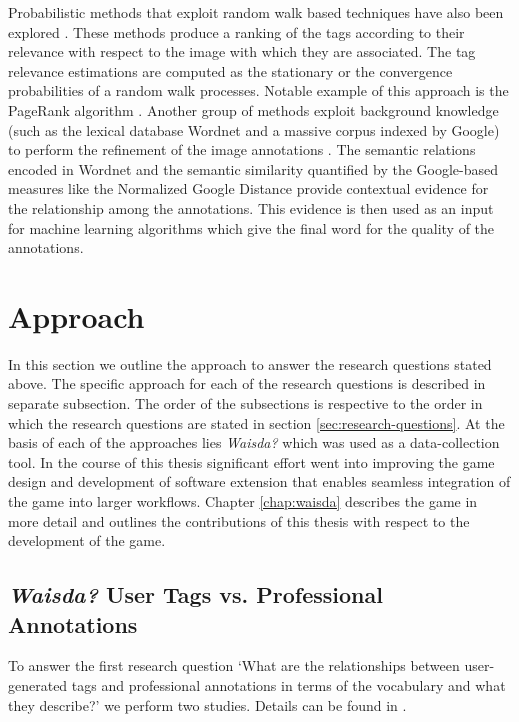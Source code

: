 Probabilistic methods that exploit random walk based techniques have also been explored \cite{Wang:2006:IAR:1180639.1180774,Liu:2009:TR:1526709.1526757,Li:2012:TRP:2382336.2382380}. These methods produce a ranking of the tags according to their relevance with respect to the image with which they are associated. The tag relevance estimations are computed as the stationary or the convergence probabilities of  a random walk processes. Notable example of this approach is the PageRank algorithm \cite{journals/corr/abs-1012-4872,10.4137/GRSB.S702,junker2008analysis}. Another group of methods exploit background knowledge (such as the lexical database Wordnet and a massive corpus indexed by Google) to perform the refinement of the image annotations \cite{Jin:2010:KBI:1731523.1731529,Wang:2007:RIA:1282280.1282343}. The semantic relations encoded in Wordnet and the semantic similarity quantified by the Google-based measures like the Normalized Google Distance \cite{DBLP:journals/corr/abs-cs-0412098} provide contextual evidence for the relationship among the annotations. This evidence is then used as an input for machine learning algorithms which give the final word for the quality of the annotations.

\section{Approach}
In this section we outline the approach to answer the research questions stated above. The specific approach for each of the research questions is described in separate subsection. The order of the subsections is respective to the order in which the research questions are stated in section \ref{sec:research-questions}. At the basis of each of the approaches lies \textit{Waisda?} which was used as a data-collection tool. In the course of this thesis significant effort went into improving the game design and development of software extension that enables seamless integration of the game into larger workflows. Chapter \ref{chap:waisda} describes the game in more detail and outlines the contributions of this thesis with respect to the development of the game.

\subsection{\textit{Waisda?} User Tags vs. Professional Annotations}\label{sec:user-professional}
To answer the first research question `What are the relationships between user-generated tags  and professional annotations in terms of the vocabulary and what they describe?' we perform two studies. Details can be found in \cite{websciencepaper,kcap}.

